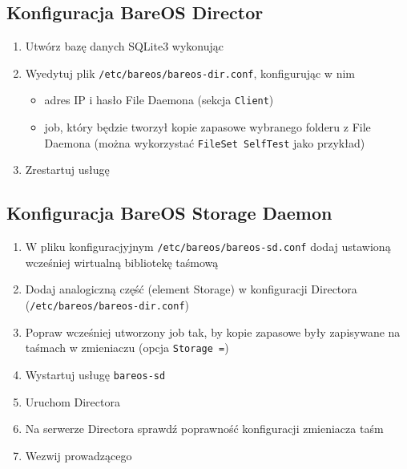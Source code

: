 \documentclass[polish]{article}
\begin{document}
\subsection*{Konfiguracja BareOS Director}

\begin{enumerate}

\item Utwórz bazę danych SQLite3 wykonując

\item Wyedytuj plik \texttt{/etc/bareos/bareos-dir.conf}, konfigurując w nim
\begin{itemize}
\item adres IP i hasło File Daemona (sekcja \texttt{Client})
\item job, który będzie tworzył kopie zapasowe wybranego folderu z File Daemona (można wykorzystać \texttt{FileSet SelfTest} jako przykład)
\end{itemize}

\item Zrestartuj usługę

\end{enumerate}


\subsection*{Konfiguracja BareOS Storage Daemon}

\begin{enumerate}

\item W pliku konfiguracjyjnym \texttt{/etc/bareos/bareos-sd.conf} dodaj ustawioną wcześniej wirtualną bibliotekę taśmową

\item Dodaj analogiczną część (element Storage) w konfiguracji Directora (\texttt{/etc/bareos/bareos-dir.conf})

\item Popraw wcześniej utworzony job tak, by kopie zapasowe były zapisywane na taśmach w zmieniaczu (opcja \texttt{Storage =})

\item Wystartuj usługę \texttt{bareos-sd}

\item Uruchom Directora

\item Na serwerze Directora sprawdź poprawność konfiguracji zmieniacza taśm

\item Wezwij prowadzącego

\end{enumerate}
\end{document}

